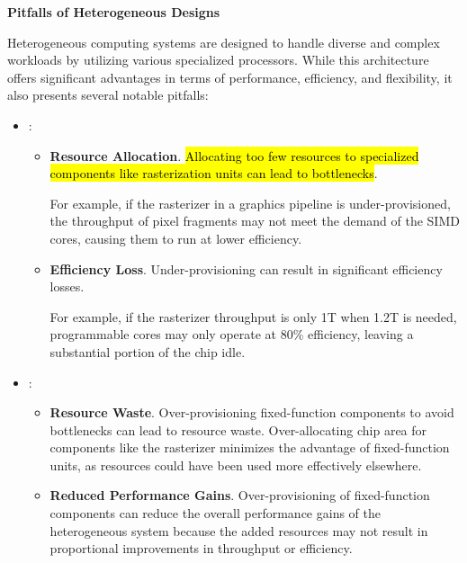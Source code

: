 \highspace
\begin{flushleft}
    \textcolor{Red2}{ \textbf{Pitfalls of Heterogeneous Designs}}
\end{flushleft}
Heterogeneous computing systems are designed to handle diverse and complex workloads by utilizing various specialized processors. While this architecture offers significant advantages in terms of performance, efficiency, and flexibility, it also presents several notable pitfalls:
\begin{itemize}
    \item {}:
    \begin{itemize}
        \item \textbf{Resource Allocation}. \hl{Allocating too few resources to specialized components like rasterization units can lead to bottlenecks}.
        \begin{examplebox}
            For example, if the rasterizer in a graphics pipeline is under-provisioned, the throughput of pixel fragments may not meet the demand of the SIMD cores, causing them to run at lower efficiency.
        \end{examplebox}

        \item \textbf{Efficiency Loss}. Under-provisioning can result in significant efficiency losses.
        \begin{examplebox}
            For example, if the rasterizer throughput is only 1T when 1.2T is needed, programmable cores may only operate at 80\% efficiency, leaving a substantial portion of the chip idle.
        \end{examplebox}
    \end{itemize}

    \newpage

    \item {}:
    \begin{itemize}
        \item \textbf{Resource Waste}. Over-provisioning fixed-function components to avoid bottlenecks can lead to resource waste. Over-allocating chip area for components like the rasterizer minimizes the advantage of fixed-function units, as resources could have been used more effectively elsewhere.
        
        \item \textbf{Reduced Performance Gains}. Over-provisioning of fixed-function components can reduce the overall performance gains of the heterogeneous system because the added resources may not result in proportional improvements in throughput or efficiency.
    \end{itemize}
 

\end{itemize}
